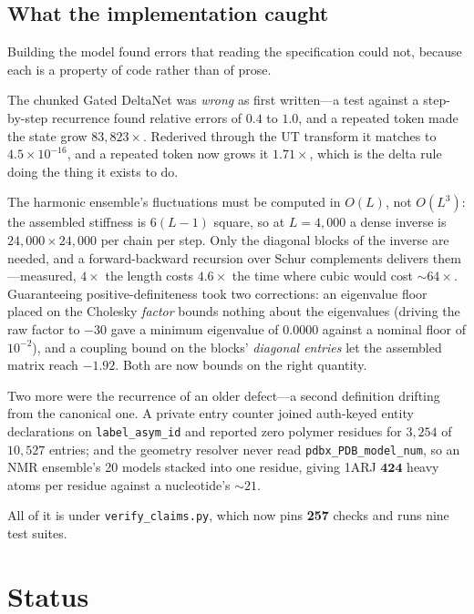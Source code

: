 \documentclass[11pt,a4paper]{article}
\begin{document}
\subsection{What the implementation caught}

Building the model found errors that reading the specification could not,
because each is a property of code rather than of prose.

The chunked Gated DeltaNet was \emph{wrong} as first written---a test against a
step-by-step recurrence found relative errors of $0.4$ to $1.0$, and a repeated
token made the state grow $83{,}823\times$. Rederived through the UT transform
it matches to $4.5\times10^{-16}$, and a repeated token now grows it
$1.71\times$, which is the delta rule doing the thing it exists to do.

The harmonic ensemble's fluctuations must be computed in $O(L)$, not $O(L^3)$:
the assembled stiffness is $6(L-1)$ square, so at $L = 4{,}000$ a dense inverse
is $24{,}000 \times 24{,}000$ per chain per step. Only the diagonal blocks of
the inverse are needed, and a forward-backward recursion over Schur complements
delivers them---measured, $4\times$ the length costs $4.6\times$ the time where
cubic would cost ${\sim}64\times$. Guaranteeing positive-definiteness took two
corrections: an eigenvalue floor placed on the Cholesky \emph{factor} bounds
nothing about the eigenvalues (driving the raw factor to $-30$ gave a minimum
eigenvalue of $0.0000$ against a nominal floor of $10^{-2}$), and a coupling
bound on the blocks' \emph{diagonal entries} let the assembled matrix reach
$-1.92$. Both are now bounds on the right quantity.

Two more were the recurrence of an older defect---a second definition drifting
from the canonical one. A private entry counter joined auth-keyed entity
declarations on \texttt{label\_asym\_id} and reported zero polymer residues for
$3{,}254$ of $10{,}527$ entries; and the geometry resolver never read
\texttt{pdbx\_PDB\_model\_num}, so an NMR ensemble's 20 models stacked into one
residue, giving 1ARJ $\mathbf{424}$ heavy atoms per residue against a
nucleotide's ${\sim}21$.

All of it is under \texttt{verify\_claims.py}, which now pins \textbf{257}
checks and runs nine test suites.

\section{Status}
\end{document}
